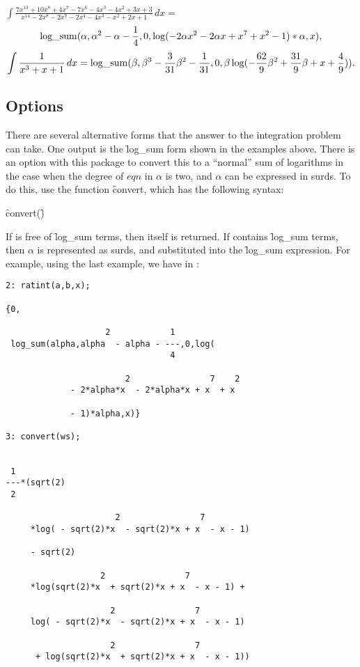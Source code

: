 \(
\displaystyle
\int \frac{7x^{13}+10x^8+4x^7-7x^6-4x^3-4x^2+3x+3}{x^{14}-2x^8-2x^7-2x^4-4x^3-x^2+2x+1} \, dx  =
\)
\[
\mathop{\mathrm{log\_sum}}(\alpha,\alpha^2  -\alpha -\frac{1}{4},0,\log( - 2\alpha x^2  - 2\alpha x + x^7  + x^2  - 1)*\alpha,x) ,
\]
\[ \int \frac{1}{x^3+x+1} \, dx = \mathop{\mathrm{log\_sum}}(\beta,\beta^3-\frac{3}{31}\beta^2-\frac{1}{31},0,\beta \log(-\frac{62}{9}\beta^2+\frac{31}{9} \beta +x+\frac{4}{9})). \]

\subsection{Options}
There are several alternative forms that the answer to the integration problem can take. One output is the \f{log\_sum} form shown in the examples above. There is an option with this package to convert this to a ``normal'' sum of logarithms in the case when the degree of $eqn$ in $\alpha$ is two, and $\alpha$ can be expressed in surds. To do this, use the function \f{convert}, which has the following syntax:
\begin{syntax}
 \f{convert(}\f{)}
\end{syntax}
If  is free of \f{log\_sum} terms, then  itself is returned. If  contains \f{log\_sum} terms, then $\alpha$ is represented as surds, and substituted into the \f{log\_sum} expression. For example, using the last example, we have in \REDUCE:
\begin{verbatim}
2: ratint(a,b,x);

{0,

                    2            1
 log_sum(alpha,alpha  - alpha - ---,0,log(
                                 4

                        2                7    2
             - 2*alpha*x  - 2*alpha*x + x  + x

             - 1)*alpha,x)}

3: convert(ws);


 1
---*(sqrt(2)
 2

                      2                7
     *log( - sqrt(2)*x  - sqrt(2)*x + x  - x - 1) 

     - sqrt(2)

                   2                7
     *log(sqrt(2)*x  + sqrt(2)*x + x  - x - 1) + 

                     2                7
     log( - sqrt(2)*x  - sqrt(2)*x + x  - x - 1)

                     2                7
      + log(sqrt(2)*x  + sqrt(2)*x + x  - x - 1))
\end{verbatim}

